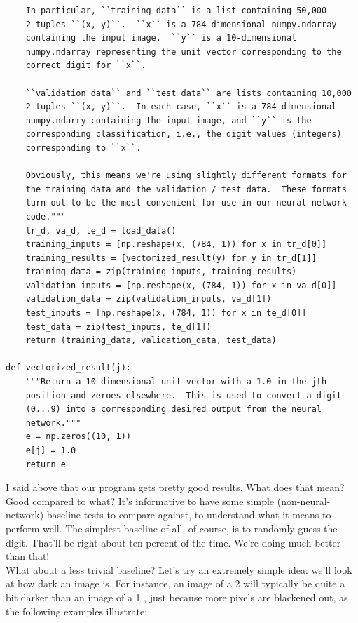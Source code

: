 \begin{lstlisting}
    In particular, ``training_data`` is a list containing 50,000
    2-tuples ``(x, y)``.  ``x`` is a 784-dimensional numpy.ndarray
    containing the input image.  ``y`` is a 10-dimensional
    numpy.ndarray representing the unit vector corresponding to the
    correct digit for ``x``.

    ``validation_data`` and ``test_data`` are lists containing 10,000
    2-tuples ``(x, y)``.  In each case, ``x`` is a 784-dimensional
    numpy.ndarry containing the input image, and ``y`` is the
    corresponding classification, i.e., the digit values (integers)
    corresponding to ``x``.

    Obviously, this means we're using slightly different formats for
    the training data and the validation / test data.  These formats
    turn out to be the most convenient for use in our neural network
    code."""
    tr_d, va_d, te_d = load_data()
    training_inputs = [np.reshape(x, (784, 1)) for x in tr_d[0]]
    training_results = [vectorized_result(y) for y in tr_d[1]]
    training_data = zip(training_inputs, training_results)
    validation_inputs = [np.reshape(x, (784, 1)) for x in va_d[0]]
    validation_data = zip(validation_inputs, va_d[1])
    test_inputs = [np.reshape(x, (784, 1)) for x in te_d[0]]
    test_data = zip(test_inputs, te_d[1])
    return (training_data, validation_data, test_data)

def vectorized_result(j):
    """Return a 10-dimensional unit vector with a 1.0 in the jth
    position and zeroes elsewhere.  This is used to convert a digit
    (0...9) into a corresponding desired output from the neural
    network."""
    e = np.zeros((10, 1))
    e[j] = 1.0
    return e
\end{lstlisting}

I said above that our program gets pretty good results. What does that mean? Good compared to what? It's informative to have some simple (non-neural-network) baseline tests to compare against, to understand what it means to perform well. The simplest baseline of all, of course, is to randomly guess the digit. That'll be right about ten percent of the time. We're doing much better than that!\\

What about a less trivial baseline? Let's try an extremely simple idea: we'll look at how dark an image is. For instance, an image of a 2  will typically be quite a bit darker than an image of a 1 , just because more pixels are blackened out, as the following examples illustrate:

